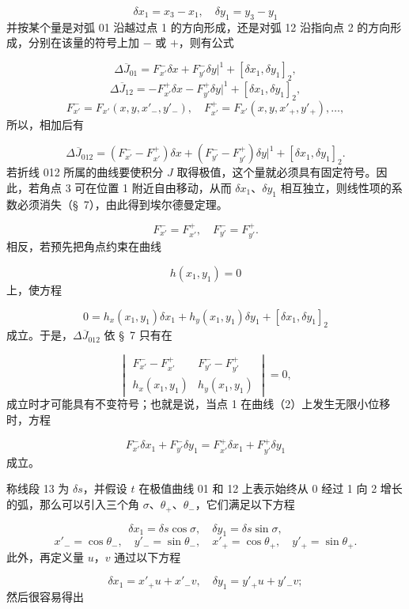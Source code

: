 \documentclass[11pt,a4paper,leqno]{article}
\begin{document}
\[
\delta x_1=x_3-x_1,\quad \delta y_1=y_3-y_1
\]
并按某个量是对弧 01 沿越过点 1 的方向形成，还是对弧 12 沿指向点 2 的方向形成，分别在该量的符号上加 $-$ 或 $+$，则有公式

\[
\Delta \overline{J}_{01}=F_{x'}^-\delta x+F_{y'}^-\delta y\big|^1+[\delta x_1,\delta y_1]_2,
\]
\[
\Delta \overline{J}_{12}=-F_{x'}^+\delta x-F_{y'}^+\delta y\big|^1+[\delta x_1,\delta y_1]_2,
\]
\[
F_{x'}^- =F_{x'}(x,y,x'_{-},y'_{-}),\quad
F_{x'}^+=F_{x'}(x,y,x'_{+},y'_{+}),\ldots,
\]
所以，相加后有

\[
\Delta\overline{J}_{012}=(F_{x'}^- -F_{x'}^+)\delta x+(F_{y'}^- -F_{y'}^+)\delta y\big|^1+[\delta x_1,\delta y_1]_2.
\]
若折线 012 所属的曲线要使积分 $J$ 取得极值，这个量就必须具有固定符号。因此，若角点 3 可在位置 1 附近自由移动，从而 $\delta x_1$、$\delta y_1$ 相互独立，则线性项的系数必须消失（\S~7），由此得到埃尔德曼定理。

\begin{equation}\tag{1}
F_{x'}^- =F_{x'}^+,
\quad F_{y'}^- =F_{y'}^+.
\end{equation}
相反，若预先把角点约束在曲线

\begin{equation}\tag{2}
h(x_1,y_1)=0
\end{equation}
上，使方程

\[
0=h_x(x_1,y_1)\delta x_1+h_y(x_1,y_1)\delta y_1+[\delta x_1,\delta y_1]_2
\]
成立。于是，$\Delta\overline{J}_{012}$ 依 \S~7 只有在

\[
\begin{vmatrix}
F_{x'}^- -F_{x'}^+&F_{y'}^- -F_{y'}^+\\
h_x(x_1,y_1)&h_y(x_1,y_1)
\end{vmatrix}=0,
\]
成立时才可能具有不变符号；也就是说，当点 1 在曲线（2）上发生无限小位移时，方程

\begin{equation}\tag{3}
F_{x'}^-\delta x_1+F_{y'}^-\delta y_1=F_{x'}^+\delta x_1+F_{y'}^+\delta y_1
\end{equation}
成立。

称线段 13 为 $\delta s$，并假设 $t$ 在极值曲线 01 和 12 上表示始终从 0 经过 1 向 2 增长的弧，那么可以引入三个角 $\sigma$、$\theta_+$、$\theta_-$，它们满足以下方程

\[
\delta x_1=\delta s\cos\sigma,\quad \delta y_1=\delta s\sin\sigma,
\]
\[
x'_{-}=\cos\theta_{-},\quad y'_{-}=\sin\theta_{-},\quad
x'_{+}=\cos\theta_{+},\quad y'_{+}=\sin\theta_{+}.
\]
此外，再定义量 $u$，$v$ 通过以下方程

\begin{equation}\tag{4}
\delta x_1=x'_{+}u+x'_{-}v,
\quad \delta y_1=y'_{+}u+y'_{-}v;
\end{equation}
然后很容易得出
\end{document}
